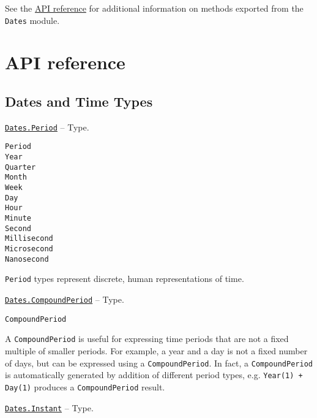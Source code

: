 See the \hyperlink{2504340439131318713}{API reference} for additional information on methods exported from the \texttt{Dates} module.



\hypertarget{14493106802066079367}{}


\chapter{API reference}



\hypertarget{7753070305007462051}{}


\section{Dates and Time Types}


\hypertarget{17624028548543163266}{}
\hyperlink{17624028548543163266}{\texttt{Dates.Period}}  -- {Type.}

\begin{adjustwidth}{2em}{0pt}


\begin{verbatim}
Period
Year
Quarter
Month
Week
Day
Hour
Minute
Second
Millisecond
Microsecond
Nanosecond
\end{verbatim}

\texttt{Period} types represent discrete, human representations of time.



\end{adjustwidth}
\hypertarget{10034674628199158268}{}
\hyperlink{10034674628199158268}{\texttt{Dates.CompoundPeriod}}  -- {Type.}

\begin{adjustwidth}{2em}{0pt}


\begin{verbatim}
CompoundPeriod
\end{verbatim}

A \texttt{CompoundPeriod} is useful for expressing time periods that are not a fixed multiple of smaller periods. For example, {\textquotedbl}a year and a  day{\textquotedbl} is not a fixed number of days, but can be expressed using a \texttt{CompoundPeriod}. In fact, a \texttt{CompoundPeriod} is automatically generated by addition of different period types, e.g. \texttt{Year(1) + Day(1)} produces a \texttt{CompoundPeriod} result.



\end{adjustwidth}
\hypertarget{4529923194910083363}{}
\hyperlink{4529923194910083363}{\texttt{Dates.Instant}}  -- {Type.}

